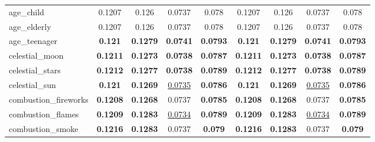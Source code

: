 \begin{center}
\begin{supertabular}{lcccc||cccc}
\small{age\_child} & {\scriptsize{0.1207}} & {\scriptsize{0.126}} & {\scriptsize{0.0737}} & {\scriptsize{0.078}}& {\scriptsize{0.1207}} & {\scriptsize{0.126}} & {\scriptsize{0.0737}} & {\scriptsize{0.078}}\\
\small{age\_elderly} & {\scriptsize{0.1207}} & {\scriptsize{0.126}} & {\scriptsize{0.0737}} & {\scriptsize{0.078}}& {\scriptsize{0.1207}} & {\scriptsize{0.126}} & {\scriptsize{0.0737}} & {\scriptsize{0.078}}\\
\small{age\_teenager} & \textbf{\scriptsize{0.121}} & \textbf{\scriptsize{0.1279}} & \textbf{\scriptsize{0.0741}} & \textbf{\scriptsize{0.0793}}& \textbf{\scriptsize{0.121}} & \textbf{\scriptsize{0.1279}} & \textbf{\scriptsize{0.0741}} & \textbf{\scriptsize{0.0793}}\\
\small{celestial\_moon} & \textbf{\scriptsize{0.1211}} & \textbf{\scriptsize{0.1273}} & \textbf{\scriptsize{0.0738}} & \textbf{\scriptsize{0.0787}}& \textbf{\scriptsize{0.1211}} & \textbf{\scriptsize{0.1273}} & \textbf{\scriptsize{0.0738}} & \textbf{\scriptsize{0.0787}}\\
\small{celestial\_stars} & \textbf{\scriptsize{0.1212}} & \textbf{\scriptsize{0.1277}} & \textbf{\scriptsize{0.0738}} & \textbf{\scriptsize{0.0789}}& \textbf{\scriptsize{0.1212}} & \textbf{\scriptsize{0.1277}} & \textbf{\scriptsize{0.0738}} & \textbf{\scriptsize{0.0789}}\\
\small{celestial\_sun} & \textbf{\scriptsize{0.121}} & \textbf{\scriptsize{0.1269}} & \underline{\scriptsize{0.0735}} & \textbf{\scriptsize{0.0786}}& \textbf{\scriptsize{0.121}} & \textbf{\scriptsize{0.1269}} & \underline{\scriptsize{0.0735}} & \textbf{\scriptsize{0.0786}}\\
\small{combustion\_fireworks} & \textbf{\scriptsize{0.1208}} & \textbf{\scriptsize{0.1268}} & {\scriptsize{0.0737}} & \textbf{\scriptsize{0.0785}}& \textbf{\scriptsize{0.1208}} & \textbf{\scriptsize{0.1268}} & {\scriptsize{0.0737}} & \textbf{\scriptsize{0.0785}}\\
\small{combustion\_flames} & \textbf{\scriptsize{0.1209}} & \textbf{\scriptsize{0.1283}} & \underline{\scriptsize{0.0734}} & \textbf{\scriptsize{0.0789}}& \textbf{\scriptsize{0.1209}} & \textbf{\scriptsize{0.1283}} & \underline{\scriptsize{0.0734}} & \textbf{\scriptsize{0.0789}}\\
\small{combustion\_smoke} & \textbf{\scriptsize{0.1216}} & \textbf{\scriptsize{0.1283}} & {\scriptsize{0.0737}} & \textbf{\scriptsize{0.079}}& \textbf{\scriptsize{0.1216}} & \textbf{\scriptsize{0.1283}} & {\scriptsize{0.0737}} & \textbf{\scriptsize{0.079}}\\

\end{supertabular}
\end{center}
